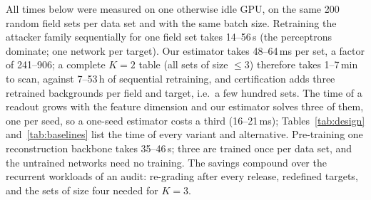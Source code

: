 All times below were measured on one otherwise idle GPU, on the same 200 random field sets per data set and with the same batch size. Retraining the attacker family sequentially for one field set takes 14--56\,s (the perceptrons dominate; one network per target). Our estimator takes 48--64\,ms per set, a factor of 241--906; a complete $K=2$ table (all sets of size $\le3$) therefore takes 1--7\,min to scan, against 7--53\,h of sequential retraining, and certification adds three retrained backgrounds per field and target, i.e.\ a few hundred sets. The time of a readout grows with the feature dimension and our estimator solves three of them, one per seed, so a one-seed estimator costs a third (16--21\,ms); Tables~\ref{tab:design} and~\ref{tab:baselines} list the time of every variant and alternative. Pre-training one reconstruction backbone takes 35--46\,s; three are trained once per data set, and the untrained networks need no training. The savings compound over the recurrent workloads of an audit: re-grading after every release, redefined targets, and the sets of size four needed for $K=3$.
